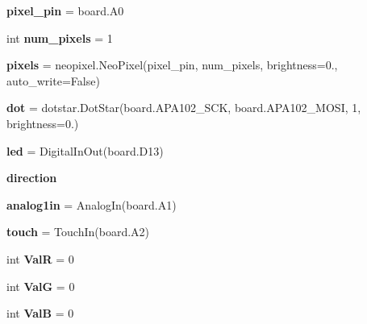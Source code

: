 \begin{DoxyCompactItemize}
\item 
\mbox{\label{namespacetouch_ac57c965e5efcdfd72fefaae0f80111b1}} 
{\bfseries pixel\+\_\+pin} = board.\+A0
\item 
\mbox{\label{namespacetouch_a0ef3f76806f7d862a36d940f09366dd8}} 
int {\bfseries num\+\_\+pixels} = 1
\item 
\mbox{\label{namespacetouch_ac9636dcc6ad4e10a87ee1d96340f47e5}} 
{\bfseries pixels} = neopixel.\+Neo\+Pixel(pixel\+\_\+pin, num\+\_\+pixels, brightness=0., auto\+\_\+write=False)
\item 
\mbox{\label{namespacetouch_af701dea0da1c0bacf3736a4e2c4dabcf}} 
{\bfseries dot} = dotstar.\+Dot\+Star(board.\+A\+P\+A102\+\_\+\+S\+CK, board.\+A\+P\+A102\+\_\+\+M\+O\+SI, 1, brightness=0.)
\item 
\mbox{\label{namespacetouch_abd75aa0b7f86c2d2e4db32eafd5b7cfd}} 
{\bfseries led} = Digital\+In\+Out(board.\+D13)
\item 
\mbox{\label{namespacetouch_af3b0b4d50655fc62a56394bd88686168}} 
{\bfseries direction}
\item 
\mbox{\label{namespacetouch_abb6ff5c49640d7ce900657e484b72b0e}} 
{\bfseries analog1in} = Analog\+In(board.\+A1)
\item 
\mbox{\label{namespacetouch_a3113831501c3ea58b222adec1fcbe9e6}} 
{\bfseries touch} = Touch\+In(board.\+A2)
\item 
\mbox{\label{namespacetouch_add1bf2cf1277ce8abc6f989fe58952e9}} 
int {\bfseries ValR} = 0
\item 
\mbox{\label{namespacetouch_a584eb3c4a704a06d14dbce1b3b89b650}} 
int {\bfseries ValG} = 0
\item 
\mbox{\label{namespacetouch_a8acdcf47817a40adbd8ff1e440b22ff1}} 
int {\bfseries ValB} = 0
\item 
\mbox{\label{namespacetouch_a6106d52744d7803b56ffefc79659874b}} 

\end{DoxyCompactItemize}
